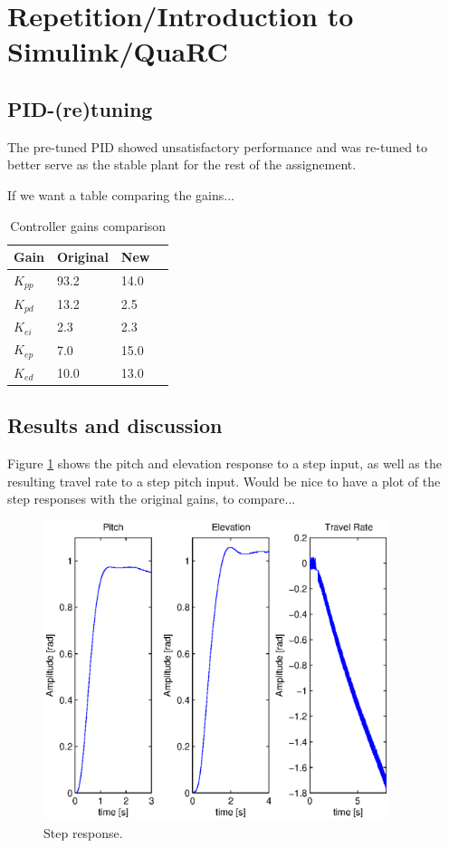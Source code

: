 \section{Repetition/Introduction to Simulink/QuaRC}\label{sec:prob1}

\subsection{PID-(re)tuning}
The pre-tuned PID showed unsatisfactory performance and was re-tuned to better serve as the stable plant for the rest of the assignement. 

If we want a table comparing the gains...
\begin{table}[hp]
	\centering
	\caption{Controller gains comparison}
	\begin{tabular}{llll}
		\hline
		Gain & Original & New \\
		\hline
		$K_{pp}$ & 93.2 & 14.0 \\
		$K_{pd}$ & 13.2 & 2.5 \\
		$K_{ei}$ & 2.3 & 2.3 \\
		$K_{ep}$ & 7.0 & 15.0 \\
		$K_{ed}$ & 10.0 & 13.0 \\
	\end{tabular}
	\label{tab:gains}
\end{table}

\subsection{Results and discussion}

Figure \ref{fig:step_response} shows the pitch and elevation response to a step input, as well as the resulting travel rate to a step pitch input.
Would be nice to have a plot of the step responses with the original gains, to compare...

\begin{figure}[hp]
	\centering
		\includegraphics[width=0.9\textwidth]{figures/1/step_response.eps}
	\caption{Step response.}
	\label{fig:step_response}
\end{figure}


